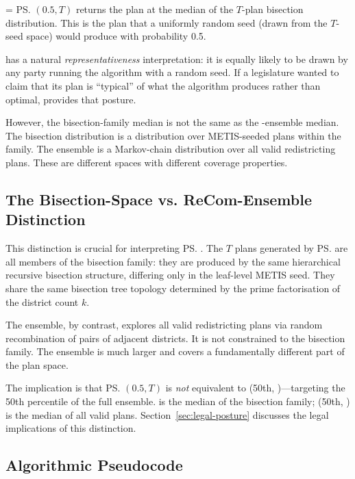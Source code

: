 \ms{} = \ps{}$(0.5, T)$ returns the plan at the median of the
$T$-plan bisection distribution.
This is the plan that a uniformly random seed (drawn from the $T$-seed
space) would produce with probability 0.5.

\ms{} has a natural \emph{representativeness} interpretation: it is equally
likely to be drawn by any party running the algorithm with a random seed.
If a legislature wanted to claim that its plan is ``typical'' of what the
algorithm produces rather than optimal, \ms{} provides that posture.

However, the bisection-family median is not the same as the \recom{}-ensemble
median.
The bisection distribution is a distribution over METIS-seeded plans
within the \ar{} family.
The \recom{} ensemble is a Markov-chain distribution over all valid
redistricting plans.
These are different spaces with different coverage properties.

\subsection{The Bisection-Space vs. ReCom-Ensemble Distinction}

This distinction is crucial for interpreting \ps{}.
The $T$ plans generated by \ps{} are all members of the \ar{} bisection
family: they are produced by the same hierarchical recursive bisection
structure, differing only in the leaf-level METIS seed.
They share the same bisection tree topology determined by the prime
factorisation of the district count $k$.

The \recom{} ensemble, by contrast, explores all valid redistricting plans
via random recombination of pairs of adjacent districts.
It is not constrained to the bisection family.
The \recom{} ensemble is much larger and covers a fundamentally different
part of the plan space.

The implication is that \ps{}$(0.5, T)$ is \emph{not} equivalent to
\ts{}(50th, \recom{})---targeting the 50th percentile of the full
\recom{} ensemble.
\ms{} is the median of the bisection family; \ts{}(50th, \recom{}) is
the median of all valid plans.
Section~\ref{sec:legal-posture} discusses the legal implications of this
distinction.

\subsection{Algorithmic Pseudocode}

